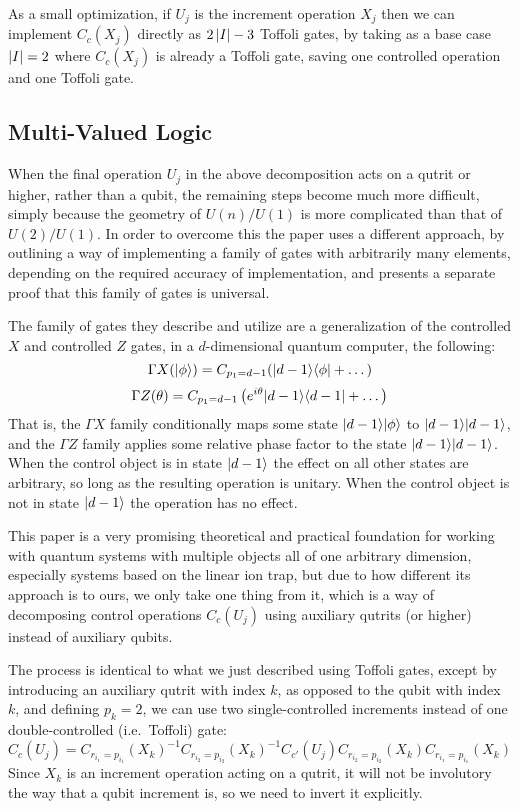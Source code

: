 As a small optimization, if $U_j$ is the increment operation $X_j$ then we can implement $C_c(X_j)$ directly as $2\left| I \right| - 3$ Toffoli gates, by taking as a base case $\left| I \right| = 2$ where $C_c(X_j)$ is already a Toffoli gate, saving one controlled operation and one Toffoli gate.
\subsection{Multi-Valued Logic}
When the final operation $U_j$ in the above decomposition acts on a qutrit or higher, rather than a qubit, the remaining steps become much more difficult, simply because the geometry of $U(n)/U(1)$ is more complicated than that of $U(2)/U(1)$. In order to overcome this the paper \cite{multi-valued-logic} uses a different approach, by outlining a way of implementing a family of gates with arbitrarily many elements, depending on the required accuracy of implementation, and presents a separate proof that this family of gates is universal.

The family of gates they describe and utilize are a generalization of the controlled $X$ and controlled $Z$ gates, in a $d$-dimensional quantum computer, the following:
\[\Gamma X(| \phi \rangle) = C_{p_1 = d-1}(| d-1 \rangle\langle \phi | + \dots)\]
\[\Gamma Z(\theta) = C_{p_1 = d-1}\left(e^{i\theta}| d-1 \rangle\langle d-1 | + \dots\right)\]
That is, the $\Gamma X$ family conditionally maps some state $| d-1 \rangle| \phi \rangle$ to $| d-1 \rangle| d-1 \rangle$, and the $\Gamma Z$ family applies some relative phase factor to the state $| d-1 \rangle| d-1 \rangle$. When the control object is in state $| d-1 \rangle$ the effect on all other states are arbitrary, so long as the resulting operation is unitary. When the control object is not in state $| d-1 \rangle$ the operation has no effect.

This paper is a very promising theoretical and practical foundation for working with quantum systems with multiple objects all of one arbitrary dimension, especially systems based on the linear ion trap, but due to how different its approach is to ours, we only take one thing from it, which is a way of decomposing control operations $C_c(U_j)$ using auxiliary qutrits (or higher) instead of auxiliary qubits.

The process is identical to what we just described using Toffoli gates, except by introducing an auxiliary qutrit with index $k$, as opposed to the qubit with index $k$, and defining $p_k = 2$, we can use two single-controlled increments instead of one double-controlled (i.e.\ Toffoli) gate:
\[
C_c(U_j) = C_{r_{i_1}=p_{i_1}}(X_k)^{-1}
C_{r_{i_2}=p_{i_2}}(X_k)^{-1}
C_{c'}(U_j)
C_{r_{i_2}=p_{i_2}}(X_k)
C_{r_{i_1}=p_{i_1}}(X_k)
\]
Since $X_k$ is an increment operation acting on a qutrit, it will not be involutory the way that a qubit increment is, so we need to invert it explicitly.

